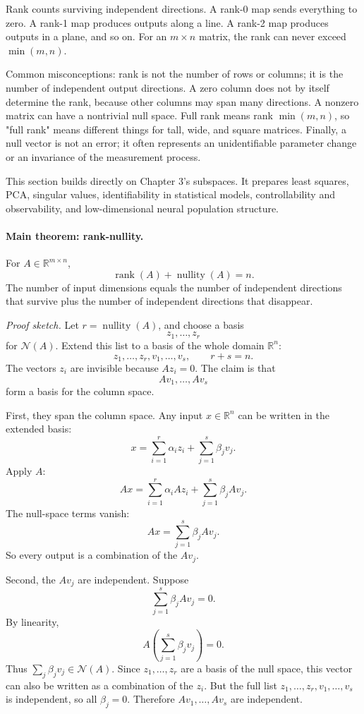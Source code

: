 Rank counts surviving independent directions. A rank-0 map sends everything to zero. A rank-1 map produces outputs along a line. A rank-2 map produces outputs in a plane, and so on. For an \(m\times n\) matrix, the rank can never exceed \(\min(m,n)\).

Common misconceptions: rank is not the number of rows or columns; it is the number of independent output directions. A zero column does not by itself determine the rank, because other columns may span many directions. A nonzero matrix can have a nontrivial null space. Full rank means rank \(\min(m,n)\), so "full rank" means different things for tall, wide, and square matrices. Finally, a null vector is not an error; it often represents an unidentifiable parameter change or an invariance of the measurement process.

This section builds directly on Chapter 3's subspaces. It prepares least squares, PCA, singular values, identifiability in statistical models, controllability and observability, and low-dimensional neural population structure.

\paragraph{Main theorem: rank-nullity.}
For \(A\in\mathbb{R}^{m\times n}\),
\[
\operatorname{rank}(A)+\operatorname{nullity}(A)=n.
\]
The number of input dimensions equals the number of independent directions that survive plus the number of independent directions that disappear.

\emph{Proof sketch.} Let \(r=\operatorname{nullity}(A)\), and choose a basis
\[
z_1,\dots,z_r
\]
for \(\mathcal{N}(A)\). Extend this list to a basis of the whole domain \(\mathbb{R}^n\):
\[
z_1,\dots,z_r,v_1,\dots,v_s,
\qquad r+s=n.
\]
The vectors \(z_i\) are invisible because \(Az_i=0\). The claim is that
\[
Av_1,\dots,Av_s
\]
form a basis for the column space.

First, they span the column space. Any input \(x\in\mathbb{R}^n\) can be written in the extended basis:
\[
x=\sum_{i=1}^r \alpha_i z_i+\sum_{j=1}^s \beta_j v_j.
\]
Apply \(A\):
\[
Ax=\sum_{i=1}^r \alpha_iAz_i+\sum_{j=1}^s \beta_jAv_j.
\]
The null-space terms vanish:
\[
Ax=\sum_{j=1}^s \beta_jAv_j.
\]
So every output is a combination of the \(Av_j\).

Second, the \(Av_j\) are independent. Suppose
\[
\sum_{j=1}^s \beta_jAv_j=0.
\]
By linearity,
\[
A\left(\sum_{j=1}^s \beta_jv_j\right)=0.
\]
Thus \(\sum_j\beta_jv_j\in\mathcal{N}(A)\). Since \(z_1,\dots,z_r\) are a basis of the null space, this vector can also be written as a combination of the \(z_i\). But the full list \(z_1,\dots,z_r,v_1,\dots,v_s\) is independent, so all \(\beta_j=0\). Therefore \(Av_1,\dots,Av_s\) are independent.

